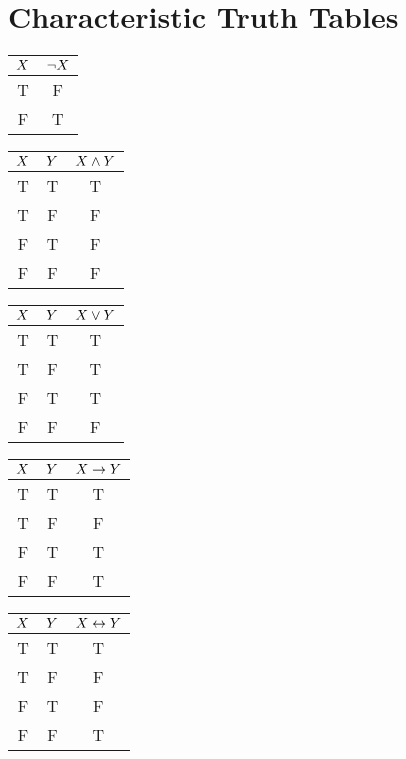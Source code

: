 \section{Characteristic Truth Tables}
\label{app.CharacteristicTTs}
\begin{center}
			\begin{minipage}{.25\textwidth}
				\begin{tabular}{c|c}
				$X$&$\neg X$\\\hline
				T&F\\
				F&T
				\end{tabular}
			\end{minipage}
			\begin{minipage}{.35\textwidth}
				\begin{tabular}{cc|c}
				$X$&$Y$&$X\wedge Y$\\\hline
				T&T&T\\
				T&F&F\\
				F&T&F\\
				F&F&F
				\end{tabular}
			\end{minipage}
			\begin{minipage}{.35\textwidth}
				\begin{tabular}{cc|c}
				$X$&$Y$&$X\vee Y$\\\hline
				T&T&T\\
				T&F&T\\
				F&T&T\\
				F&F&F
				\end{tabular}
			\end{minipage}
			
			\medskip 
			\begin{minipage}{.35\textwidth}
				\begin{tabular}{cc|c}
				$X$&$Y$&$X\rightarrow Y$\\\hline
				T&T&T\\
				T&F&F\\
				F&T&T\\
				F&F&T
				\end{tabular}
			\end{minipage}
			\begin{minipage}{.35\textwidth}
				\begin{tabular}{cc|c}
				$X$&$Y$&$X\leftrightarrow Y$\\\hline
				T&T&T\\
				T&F&F\\
				F&T&F\\
				F&F&T
				\end{tabular}
			\end{minipage}
	\end{center}


